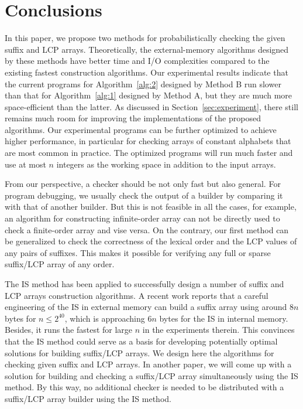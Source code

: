 \documentclass[10pt,journal,compsoc]{IEEEtran}
\begin{document}
\section{Conclusions} \label{sec:conclusion}

In this paper, we propose two methods for probabilistically checking the given suffix and LCP arrays. Theoretically, the external-memory algorithms designed by these methods have better time and I/O complexities compared to the existing fastest construction algorithms. Our experimental results indicate that the current programs for Algorithm~\ref{alg:2} designed by Method B run slower than that for Algorithm~\ref{alg:1} designed by Method A, but they are much more space-efficient than the latter. As discussed in Section~\ref{sec:experiment}, there still remains much room for improving the implementations of the proposed algorithms. Our experimental programs can be further optimized to achieve higher performance, in particular for checking arrays of constant alphabets that are most common in practice. The optimized programs will run much faster and use at most $n$ integers as the working space in addition to the input arrays. 

From our perspective, a checker should be not only fast but also general. For program debugging, we usually check the output of a builder by comparing it with that of another builder. But this is not feasible in all the cases, for example, an algorithm for constructing infinite-order array can not be directly used to check a finite-order array and vise versa. On the contrary, our first method can be generalized to check the correctness of the lexical order and the LCP values of any pairs of suffixes. This makes it possible for verifying any full or sparse suffix/LCP array of any order.

The IS method has been applied to successfully design a number of suffix and LCP arrays construction algorithms. A recent work \cite{Karkkainen2017} reports that a careful engineering of the IS in external memory can build a suffix array using around $8n$ bytes for $n\le 2^{40}$, which is approaching $6n$ bytes for the IS in internal memory. Besides, it runs the fastest for large $n$ in the experiments therein. This convinces that the IS method could serve as a basis for developing potentially optimal solutions for building suffix/LCP arrays. We design here the algorithms for checking given suffix and LCP arrays. In another paper, we will come up with a solution for building and checking a suffix/LCP array simultaneously using the IS method. By this way, no additional checker is needed to be distributed with a suffix/LCP array builder using the IS method.
\end{document}
